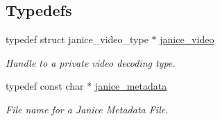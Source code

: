 \subsection*{Typedefs}
\begin{DoxyCompactItemize}
\item 
\hypertarget{group__janice__io_ga01c80201c1ce11f8c7a52cf9493b3ee2}{}typedef struct janice\+\_\+video\+\_\+type $\ast$ \hyperlink{group__janice__io_ga01c80201c1ce11f8c7a52cf9493b3ee2}{janice\+\_\+video}\label{group__janice__io_ga01c80201c1ce11f8c7a52cf9493b3ee2}

\begin{DoxyCompactList}\small\item\em Handle to a private video decoding type. \end{DoxyCompactList}\item 
typedef const char $\ast$ \hyperlink{group__janice__io_ga98fb8d1945016f13408aa772de4c3e64}{janice\+\_\+metadata}
\begin{DoxyCompactList}\small\item\em File name for a Janice Metadata File. \end{DoxyCompactList}\end{DoxyCompactItemize}
